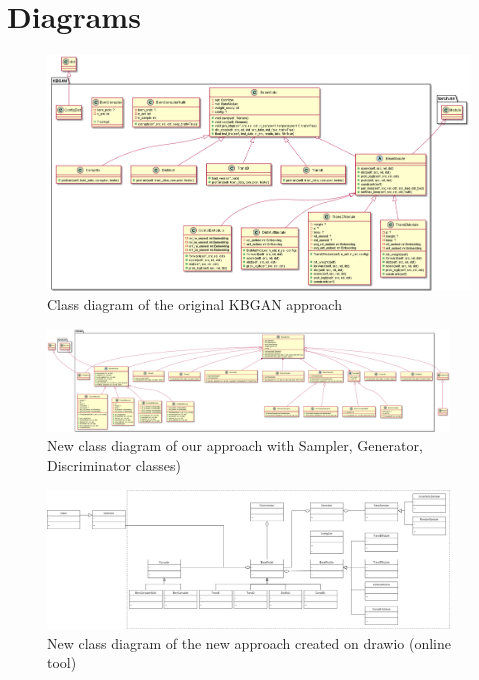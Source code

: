 \chapter{Diagrams} \label{ch:appendix_diagrams}

\begin{figure}
  \centering
    \includegraphics[width=\textwidth]{appendices/kbgan_classdiagram.png}
  \caption{Class diagram of the original \ac{KBGAN} approach}
  \label{fig:overview}
\end{figure}

\begin{figure}
  \centering
    \includegraphics[width=0.95\textwidth]{appendices/NewClassDiagram.png}
  \caption{New class diagram of our approach with Sampler, Generator, Discriminator classes)}
  \label{fig:overview}
\end{figure}

\begin{figure}
  \centering
    \includegraphics[width=0.95\textwidth]{appendices/NewClassDiagram.drawio.png}
  \caption{New class diagram of the new approach created on drawio (online tool)}
  \label{fig:overview}
\end{figure}

